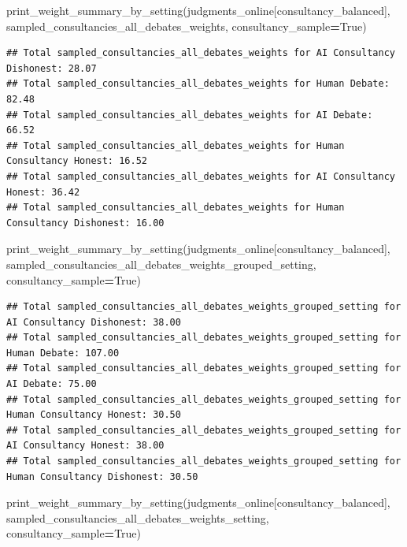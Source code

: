 \documentclass[
]{article}
\newenvironment{Shaded}{\begin{snugshade}}{\end{snugshade}}
\newcommand{\NormalTok}[1]{#1}
\newcommand{\OperatorTok}[1]{\textcolor[rgb]{0.81,0.36,0.00}{\textbf{#1}}}
\newcommand{\StringTok}[1]{\textcolor[rgb]{0.31,0.60,0.02}{#1}}
\newcommand{\VariableTok}[1]{\textcolor[rgb]{0.00,0.00,0.00}{#1}}
\begin{document}
\begin{Shaded}
\begin{Highlighting}[]
\NormalTok{print\_weight\_summary\_by\_setting(judgments\_online[consultancy\_balanced], }\StringTok{\textquotesingle{}sampled\_consultancies\_all\_debates\_weights\textquotesingle{}}\NormalTok{, consultancy\_sample}\OperatorTok{=}\VariableTok{True}\NormalTok{)}
\end{Highlighting}
\end{Shaded}

\begin{verbatim}
## Total sampled_consultancies_all_debates_weights for AI Consultancy Dishonest: 28.07
## Total sampled_consultancies_all_debates_weights for Human Debate: 82.48
## Total sampled_consultancies_all_debates_weights for AI Debate: 66.52
## Total sampled_consultancies_all_debates_weights for Human Consultancy Honest: 16.52
## Total sampled_consultancies_all_debates_weights for AI Consultancy Honest: 36.42
## Total sampled_consultancies_all_debates_weights for Human Consultancy Dishonest: 16.00
\end{verbatim}

\begin{Shaded}
\begin{Highlighting}[]
\NormalTok{print\_weight\_summary\_by\_setting(judgments\_online[consultancy\_balanced], }\StringTok{\textquotesingle{}sampled\_consultancies\_all\_debates\_weights\_grouped\_setting\textquotesingle{}}\NormalTok{, consultancy\_sample}\OperatorTok{=}\VariableTok{True}\NormalTok{)}
\end{Highlighting}
\end{Shaded}

\begin{verbatim}
## Total sampled_consultancies_all_debates_weights_grouped_setting for AI Consultancy Dishonest: 38.00
## Total sampled_consultancies_all_debates_weights_grouped_setting for Human Debate: 107.00
## Total sampled_consultancies_all_debates_weights_grouped_setting for AI Debate: 75.00
## Total sampled_consultancies_all_debates_weights_grouped_setting for Human Consultancy Honest: 30.50
## Total sampled_consultancies_all_debates_weights_grouped_setting for AI Consultancy Honest: 38.00
## Total sampled_consultancies_all_debates_weights_grouped_setting for Human Consultancy Dishonest: 30.50
\end{verbatim}

\begin{Shaded}
\begin{Highlighting}[]
\NormalTok{print\_weight\_summary\_by\_setting(judgments\_online[consultancy\_balanced], }\StringTok{\textquotesingle{}sampled\_consultancies\_all\_debates\_weights\_setting\textquotesingle{}}\NormalTok{, consultancy\_sample}\OperatorTok{=}\VariableTok{True}\NormalTok{)}
\end{Highlighting}
\end{Shaded}
\end{document}
